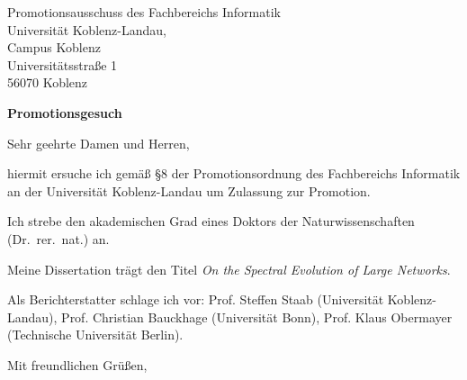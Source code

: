 \documentclass{letter}
\begin{document}
\begin{letter}{Promotionsausschuss des Fachbereichs Informatik\\
Universität Koblenz-Landau,\\
	       Campus Koblenz\\
	       Universitätsstraße 1\\
	       56070 Koblenz}

\textbf{Promotionsgesuch}

\opening{Sehr geehrte Damen und Herren,}

hiermit ersuche ich gemäß §8 der Promotionsordnung des Fachbereichs
Informatik an der Universität Koblenz-Landau um Zulassung zur Promotion.  

Ich strebe den akademischen Grad eines Doktors der Naturwissenschaften
(Dr.\ rer.\ nat.) an. 

Meine Dissertation trägt den Titel \emph{On the Spectral Evolution of Large Networks}.

Als Berichterstatter schlage ich vor:  Prof. Steffen Staab (Universität
Koblenz-Landau), Prof. Christian Bauckhage (Universität Bonn),
Prof. Klaus Obermayer (Technische Universität Berlin). 

\closing{Mit freundlichen Grüßen,}
\end{letter}
\end{document}

